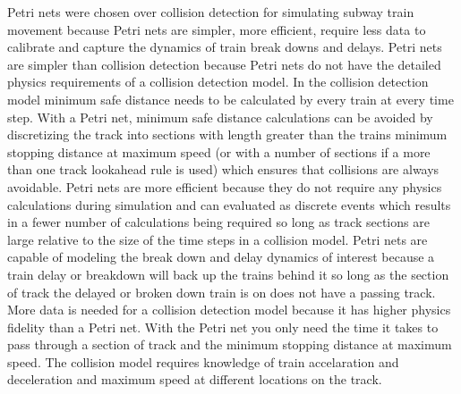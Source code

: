 Petri nets were chosen over collision detection for simulating subway train
movement because Petri nets are simpler, more efficient, require less data to
calibrate and capture the dynamics of train break downs and delays. Petri nets are simpler than collision detection because Petri nets do not have
the detailed physics requirements of a collision detection model. In the
collision detection model minimum safe distance needs to be calculated by every
train at every time step. With a Petri net, minimum safe distance calculations
can be avoided by discretizing the track into sections with length greater than
the trains minimum stopping distance at maximum speed (or with a number of
sections if a more than one track lookahead rule is used) which ensures that
collisions are always avoidable. Petri nets are more efficient because they do not require any physics calculations during simulation and can evaluated as discrete events which results in a fewer number of calculations being required so long as track sections are large relative to the size of the time steps in a collision model. Petri nets are capable of modeling the break down and delay dynamics of interest because a train delay or breakdown will back up the trains behind it so long as the section of track the delayed or broken down train is on does not have a
passing track. More data is needed for a collision detection model because it has higher physics fidelity than a Petri net. With the Petri net you only need the time it takes to pass through a section of track and the minimum stopping distance at
maximum speed. The collision model requires knowledge of train accelaration and
deceleration and maximum speed at different locations on the track.
